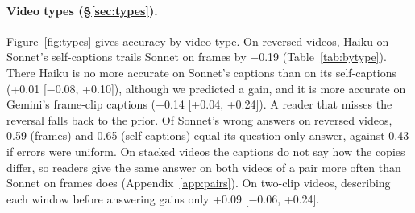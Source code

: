 \documentclass[11pt]{article}
\begin{document}
\paragraph{Video types (\S\ref{sec:types}).} Figure~\ref{fig:types} gives accuracy by video type. On reversed videos, Haiku on Sonnet's self-captions trails Sonnet on frames by −0.19 (Table~\ref{tab:bytype}). There Haiku is no more accurate on Sonnet's captions than on its self-captions (+0.01 [−0.08, +0.10]), although we predicted a gain, and it is more accurate on Gemini's frame-clip captions (+0.14 [+0.04, +0.24]). A reader that misses the reversal falls back to the prior. Of Sonnet's wrong answers on reversed videos, 0.59 (frames) and 0.65 (self-captions) equal its question-only answer, against 0.43 if errors were uniform. On stacked videos the captions do not say how the copies differ, so readers give the same answer on both videos of a pair more often than Sonnet on frames does (Appendix~\ref{app:pairs}). On two-clip videos, describing each window before answering gains only +0.09 [−0.06, +0.24].

\begin{table}[t]
\centering
\footnotesize
\setlength{\tabcolsep}{2.5pt}
\caption{Where Sonnet's headroom goes, by video type (Sonnet as captioner and reader; 95\% CIs over clip clusters). Modality = self-captions − frames; the perception shortfall is 1 − frames.}
\label{tab:headroom}
\end{table}
\end{document}
